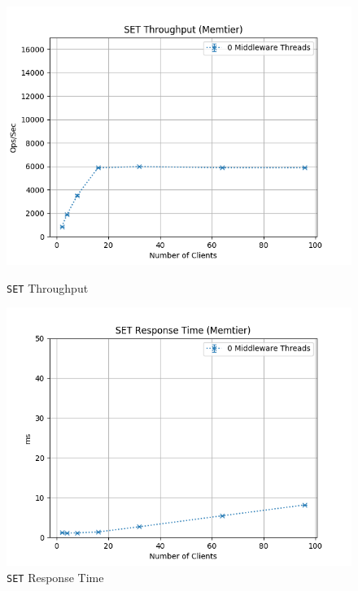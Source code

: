 \documentclass[11pt,a4paper]{article}
\begin{document}
\begin{figure}[H]
	\centering
    \begin{minipage}{0.5\textwidth}
        \centering
        \includegraphics[width=\textwidth]{../illustrations/plots/1_2_two_servers/1-0/memtier_set_tp_s.png}
        \caption{\texttt{SET} Throughput}
        \label{fig:two_servers_set_tp}
    \end{minipage}\hfill
    \begin{minipage}{0.5\textwidth}
        \centering
        \includegraphics[width=\textwidth]{../illustrations/plots/1_2_two_servers/1-0/memtier_set_rt_ms.png}
        \caption{\texttt{SET} Response Time}
        \label{fig:two_servers_set_rt}
    \end{minipage}
\end{figure}
\end{document}
